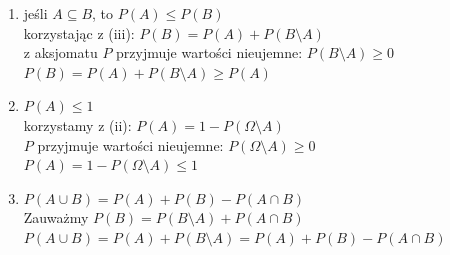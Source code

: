 \begin{enumerate}
	\item[(iv)]
	      jeśli \(A \subseteq B\), to \(P(A) \leqslant P(B)\)\\
	      korzystając z (iii): \(P(B) = P(A) + P(B\setminus A)\)\\
	      z aksjomatu \(P\) przyjmuje wartości nieujemne:
	      \(P(B\setminus A) \geqslant 0\)\\
	      \(P(B) = P(A) + P(B\setminus A) \geqslant P(A)\)

	\item[(v)]
	      \(P(A) \leqslant 1\)\\
	      korzystamy z (ii): \(P(A) = 1 - P(\Omega\setminus A)\)\\
	      \(P\) przyjmuje wartości nieujemne: \(P(\Omega\setminus A) \geqslant 0\)\\
	      \(P(A) = 1 - P(\Omega\setminus A) \leqslant 1\)

	\item[(vi)]
	      \(P(A\cup B) = P(A) + P(B) - P(A\cap B)\)\\
	      Zauważmy \(P(B) = P(B\setminus A) + P(A\cap B)\)\\
	      \(P(A\cup B) = P(A) + P(B\setminus A) = P(A) + P(B) - P(A\cap B)\)
\end{enumerate}
